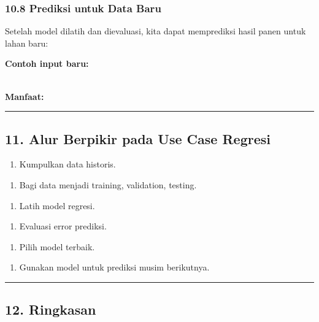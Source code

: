 \documentclass[12pt,a4paper]{article}
\begin{document}
\subsubsection{10.8 Prediksi untuk Data Baru}

Setelah model dilatih dan dievaluasi, kita dapat memprediksi hasil panen untuk lahan baru:


\textbf{Contoh input baru:}


\\[
\hat{y} = f(X_{\text{baru}})
\\]


\textbf{Manfaat:}


\hrule


\subsection{11. Alur Berpikir pada Use Case Regresi}

\begin{enumerate}
\item Kumpulkan data historis.
\end{enumerate}

\begin{enumerate}
\item Bagi data menjadi training, validation, testing.
\end{enumerate}

\begin{enumerate}
\item Latih model regresi.
\end{enumerate}

\begin{enumerate}
\item Evaluasi error prediksi.
\end{enumerate}

\begin{enumerate}
\item Pilih model terbaik.
\end{enumerate}

\begin{enumerate}
\item Gunakan model untuk prediksi musim berikutnya.
\end{enumerate}


\hrule


\subsection{12. Ringkasan}
\end{document}
